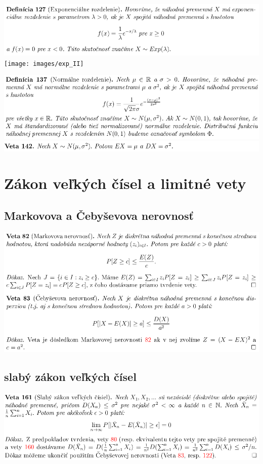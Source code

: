 \includegraphics[width=1\textwidth]{images/exp_rozd}\\
\texttt{[image: images/exp\_II]}

\includegraphics[width=1\textwidth]{images/norm_rozd}\\
\includegraphics[width=1\textwidth]{images/norm_rozd_II}\\

\section{Zákon veľkých čísel a limitné vety}

\subsection {Markovova a Čebyševova nerovnosť}
\includegraphics[width=1\textwidth]{images/mark_cebys_ner}\\
\subsection {slabý zákon veľkých čísel}
\includegraphics[width=1\textwidth]{images/slaby_zak_velk_cis}\\
